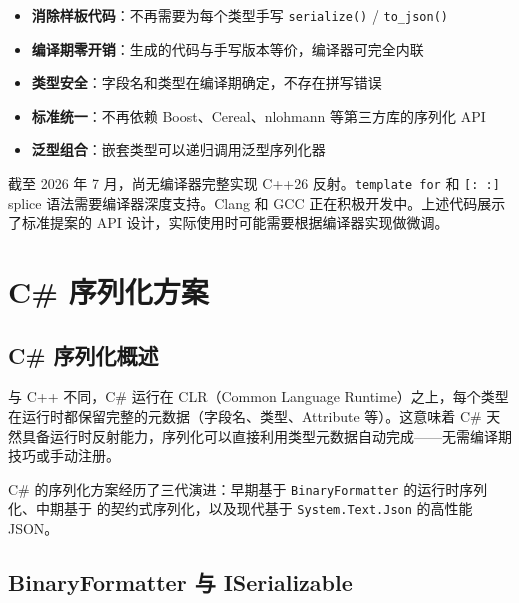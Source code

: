 \documentclass[12pt,a4paper,fontset=fandol]{ctexbook}
\newcommand{\Fn}[1]{\texttt{#1()}}
\newcommand{\Tp}[1]{\texttt{#1}}
\begin{document}
\begin{bestpractice}[title={C++26 反射的序列化意义}]
\begin{itemize}[nosep]
  \item \textbf{消除样板代码}：不再需要为每个类型手写 \Fn{serialize} / \Fn{to\_json}
  \item \textbf{编译期零开销}：生成的代码与手写版本等价，编译器可完全内联
  \item \textbf{类型安全}：字段名和类型在编译期确定，不存在拼写错误
  \item \textbf{标准统一}：不再依赖 Boost、Cereal、nlohmann 等第三方库的序列化 API
  \item \textbf{泛型组合}：嵌套类型可以递归调用泛型序列化器
\end{itemize}
\end{bestpractice}

\begin{note}[title={C++26 反射当前状态}]
截至 2026 年 7 月，尚无编译器完整实现 C++26 反射。\texttt{template for} 和 \texttt{[: :]} splice 语法需要编译器深度支持。Clang 和 GCC 正在积极开发中。上述代码展示了标准提案的 API 设计，实际使用时可能需要根据编译器实现做微调。
\end{note}

\part{C\# 序列化方案}

\chapter{C\# 序列化概述}\label{ch:csharp-overview}

与 C++ 不同，C\# 运行在 CLR（Common Language Runtime）之上，每个类型在运行时都保留完整的元数据（字段名、类型、Attribute 等）。这意味着 C\# 天然具备运行时反射能力，序列化可以直接利用类型元数据自动完成——无需编译期技巧或手动注册。

C\# 的序列化方案经历了三代演进：早期基于 \Tp{BinaryFormatter} 的运行时序列化、中期基于  的契约式序列化，以及现代基于 \Tp{System.Text.Json} 的高性能 JSON。

\chapter{BinaryFormatter 与 ISerializable}\label{ch:binary-fmt}
\end{document}
